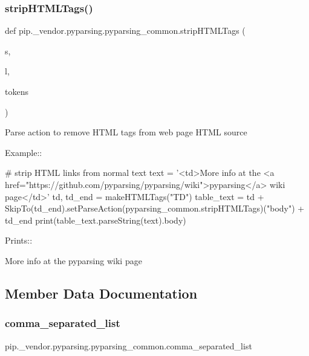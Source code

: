 \subsubsection{\texorpdfstring{strip\+H\+T\+M\+L\+Tags()}{stripHTMLTags()}}
{\footnotesize\ttfamily def pip.\+\_\+vendor.\+pyparsing.\+pyparsing\+\_\+common.\+strip\+H\+T\+M\+L\+Tags (\begin{DoxyParamCaption}\item[{}]{s,  }\item[{}]{l,  }\item[{}]{tokens }\end{DoxyParamCaption})\hspace{0.3cm}{\ttfamily [static]}}

\begin{DoxyVerb}Parse action to remove HTML tags from web page HTML source

Example::

    # strip HTML links from normal text
    text = '<td>More info at the <a href="https://github.com/pyparsing/pyparsing/wiki">pyparsing</a> wiki page</td>'
    td, td_end = makeHTMLTags("TD")
    table_text = td + SkipTo(td_end).setParseAction(pyparsing_common.stripHTMLTags)("body") + td_end
    print(table_text.parseString(text).body)

Prints::

    More info at the pyparsing wiki page
\end{DoxyVerb}
 

\subsection{Member Data Documentation}
\mbox{\label{classpip_1_1__vendor_1_1pyparsing_1_1pyparsing__common_aa91d21536990bd35ee927c9847a5c145}} 
\subsubsection{\texorpdfstring{comma\+\_\+separated\+\_\+list}{comma\_separated\_list}}
{\footnotesize\ttfamily pip.\+\_\+vendor.\+pyparsing.\+pyparsing\+\_\+common.\+comma\+\_\+separated\+\_\+list\hspace{0.3cm}{\ttfamily [static]}}

